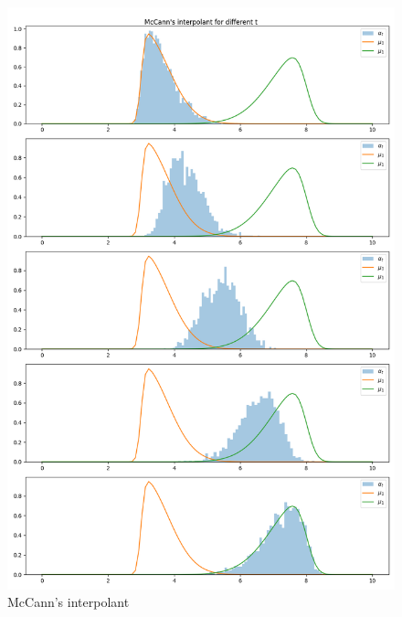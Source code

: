 \begin{figure}[!ht]
    \centering
    \includegraphics[width=\textwidth]{figures/mccann_1D_2skew.png}
    \caption{McCann's interpolant}
    \label{fig:mccann_1D_2skew}
\end{figure}
